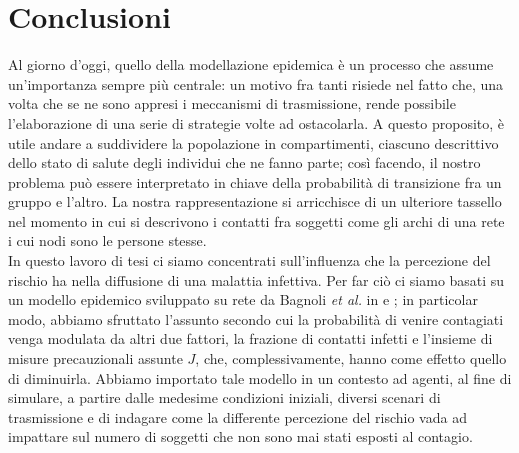 \chapter{Conclusioni}
\label{chap:conclusioni}
Al giorno d'oggi, quello della modellazione epidemica è un processo che assume un'importanza sempre più centrale: un motivo fra tanti risiede nel fatto che, una volta che se ne sono appresi i meccanismi di trasmissione, rende possibile l'elaborazione di una serie di strategie volte ad ostacolarla. A questo proposito, è utile andare a suddividere la popolazione in compartimenti, ciascuno descrittivo dello stato di salute degli individui che ne fanno parte; così facendo, il nostro problema può essere interpretato in chiave della probabilità di transizione fra un gruppo e l'altro. La nostra rappresentazione si arricchisce di un ulteriore tassello nel momento in cui si descrivono i contatti fra soggetti come gli archi di una rete i cui nodi sono le persone stesse. 
\medskip
\\
In questo lavoro di tesi ci siamo concentrati sull'influenza che la percezione del rischio ha nella diffusione di una malattia infettiva. Per far ciò ci siamo basati su un modello epidemico sviluppato su rete da Bagnoli \textit{et al.} in \cite{Bagnoli2014} e \cite{Bagnoli2007}; in particolar modo, abbiamo sfruttato l'assunto secondo cui la probabilità di venire contagiati venga modulata da altri due fattori, la frazione di contatti infetti e l'insieme di misure precauzionali assunte $ J $, che, complessivamente, hanno come effetto quello di diminuirla. Abbiamo importato tale modello in un contesto ad agenti, al fine di simulare, a partire dalle medesime condizioni iniziali, diversi scenari di trasmissione e di indagare come la differente percezione del rischio vada ad impattare sul numero di soggetti che non sono mai stati esposti al contagio. 

